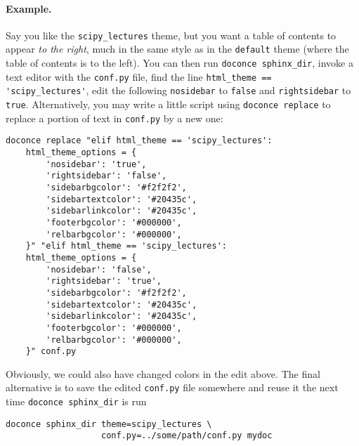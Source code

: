 \documentclass[%
oneside,                 %
final,                   %
10pt]{article}
\begin{document}
\paragraph{Example.}
Say you like the {\fontsize{10pt}{10pt}\Verb!scipy_lectures!} theme, but you want
a table of contents to appear \emph{to the right}, much in the same style
as in the {\fontsize{10pt}{10pt}\Verb!default!} theme (where the table of contents is to the left).
You can then run {\fontsize{10pt}{10pt}\Verb!doconce sphinx_dir!}, invoke a text editor with the
{\fontsize{10pt}{10pt}\Verb!conf.py!} file, find the line {\fontsize{10pt}{10pt}\Verb!html_theme == 'scipy_lectures'!},
edit the following {\fontsize{10pt}{10pt}\Verb!nosidebar!} to {\fontsize{10pt}{10pt}\Verb!false!} and {\fontsize{10pt}{10pt}\Verb!rightsidebar!} to {\fontsize{10pt}{10pt}\Verb!true!}.
Alternatively, you may write a little script using {\fontsize{10pt}{10pt}\Verb!doconce replace!}
to replace a portion of text in {\fontsize{10pt}{10pt}\Verb!conf.py!} by a new one:

\begin{verbatim}
doconce replace "elif html_theme == 'scipy_lectures':
    html_theme_options = {
        'nosidebar': 'true',
        'rightsidebar': 'false',
        'sidebarbgcolor': '#f2f2f2',
        'sidebartextcolor': '#20435c',
        'sidebarlinkcolor': '#20435c',
        'footerbgcolor': '#000000',
        'relbarbgcolor': '#000000',
    }" "elif html_theme == 'scipy_lectures':
    html_theme_options = {
        'nosidebar': 'false',
        'rightsidebar': 'true',
        'sidebarbgcolor': '#f2f2f2',
        'sidebartextcolor': '#20435c',
        'sidebarlinkcolor': '#20435c',
        'footerbgcolor': '#000000',
        'relbarbgcolor': '#000000',
    }" conf.py
\end{verbatim}
\noindent
Obviously, we could also have changed colors in the edit above.
The final alternative is to save the edited {\fontsize{10pt}{10pt}\Verb!conf.py!} file somewhere
and reuse it the next time {\fontsize{10pt}{10pt}\Verb!doconce sphinx_dir!} is run

\vspace{4pt}
\begin{Verbatim}[numbers=none,frame=lines,label=\fbox{{\tiny Terminal}},fontsize=\fontsize{9pt}{9pt},
labelposition=topline,framesep=2.5mm,framerule=0.7pt]
doconce sphinx_dir theme=scipy_lectures \ 
                   conf.py=../some/path/conf.py mydoc
\end{Verbatim}
\end{document}
